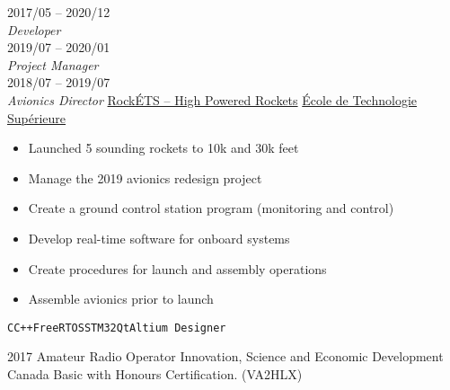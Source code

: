\documentclass[9pt]{developercv} %
\begin{document}
\begin{minipage}[t]{0.8\textwidth}
\begin{entrylist}
	\entry
		{2017/05 -- 2020/12\\{\small\emph{Developer}}\\2019/07 -- 2020/01\\{\small\emph{Project Manager}}\\2018/07 -- 2019/07\\{\small\emph{Avionics Director}}}
		{\href{https://clubrockets.ca/en/}{RockÉTS -- High Powered Rockets}}
		{\href{https://clubrockets.ca/en/}{École de Technologie Supérieure}}
		{
			\vspace{-14pt}
			\begin{itemize}
				\renewcommand{\labelitemi}{\raisebox{.45ex}{\rule{.6ex}{.6ex}}}
				\setlength\itemsep{-1pt}
				\item Launched 5 sounding rockets to 10k and 30k feet
				\item Manage the 2019 avionics redesign project
				\item Create a ground control station program (monitoring and control)
				\item Develop real-time software for onboard systems
				\item Create procedures for launch and assembly operations
				\item Assemble avionics prior to launch
			\end{itemize}
			\vspace{-4pt}
			\texttt{C}\slashsep\texttt{C++}\slashsep\texttt{FreeRTOS}\slashsep\texttt{STM32}\slashsep\texttt{Qt}\slashsep\texttt{Altium Designer}
		}
	\end{entrylist}



	\begin{entrylist}
		\entry
			{2017}
			{Amateur Radio Operator}
			{Innovation, Science and Economic Development Canada}
			{
				Basic with Honours Certification. (VA2HLX)
			}
	\end{entrylist}
\end{minipage}
\begin{minipage}[t]{0.02\textwidth}
	\hfill
\end{minipage}
\end{document}
